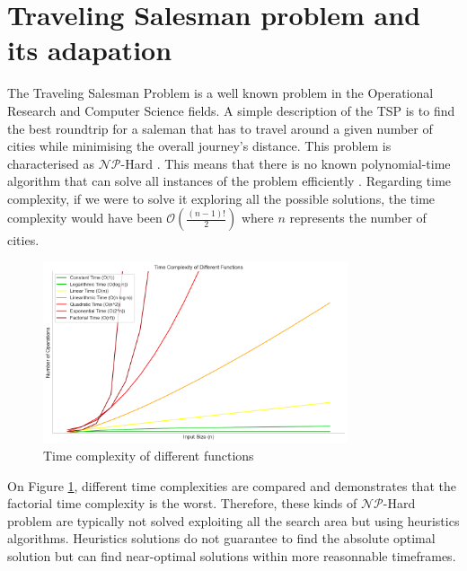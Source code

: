 


\newpage
\section{Traveling Salesman problem and its adapation}
\label{sec:TSP}

The Traveling Salesman Problem is a well known problem in the Operational Research and Computer Science fields. A simple description of the TSP is to find the best roundtrip for a saleman that has to travel around a given number of cities while minimising the overall journey's distance.
This problem is characterised as $\mathcal{NP}$-Hard \cite{np_hardness}. This means that there is no known polynomial-time algorithm that can solve all instances of the problem efficiently . Regarding time complexity, if we were to solve it exploring all the possible solutions, the time complexity would have been $\mathcal{O}(\frac{(n-1)!}{2})$ where $n$ represents the number of cities.

\begin{figure}[!ht]
    \centering
    \includegraphics[width=0.8\textwidth]{Figures/NP-hardness - time complexity.png}
    \caption{Time complexity of different functions \cite{time_complexity}}
    \label{fig:time_complexity_comparisons}
\end{figure}

On Figure \ref{fig:time_complexity_comparisons}, different time complexities are compared and demonstrates that the factorial time complexity is the worst. Therefore, these kinds of $\mathcal{NP}$-Hard problem are typically not solved exploiting all the search area but using heuristics algorithms. Heuristics solutions do not guarantee to find the absolute optimal solution but can find near-optimal solutions within more reasonnable timeframes.

